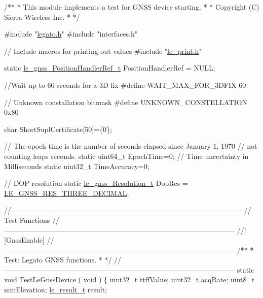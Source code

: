 
\begin{DoxyCodeInclude}
\textcolor{comment}{ /**}
\textcolor{comment}{  * This module implements a test for GNSS device starting.}
\textcolor{comment}{  *}
\textcolor{comment}{  * Copyright (C) Sierra Wireless Inc.}
\textcolor{comment}{  *}
\textcolor{comment}{  */}

\textcolor{preprocessor}{#include "\hyperlink{legato_8h}{legato.h}"}
\textcolor{preprocessor}{#include "interfaces.h"}

\textcolor{comment}{// Include macros for printing out values}
\textcolor{preprocessor}{#include "\hyperlink{le__print_8h}{le\_print.h}"}

\textcolor{keyword}{static} \hyperlink{le__gnss__interface_8h_a55a27b330b348c8d78073fe0e3e784eb}{le\_gnss\_PositionHandlerRef\_t} PositionHandlerRef = NULL;

\textcolor{comment}{//Wait up to 60 seconds for a 3D fix}
\textcolor{preprocessor}{#define WAIT\_MAX\_FOR\_3DFIX  60}

\textcolor{comment}{// Unknown constallation bitmask}
\textcolor{preprocessor}{#define UNKNOWN\_CONSTELLATION  0x80}

\textcolor{keywordtype}{char} ShortSuplCertificate[50]=\{0\};

\textcolor{comment}{// The epoch time is the number of seconds elapsed since January 1, 1970}
\textcolor{comment}{// not counting leaps seconds.}
\textcolor{keyword}{static} uint64\_t EpochTime=0;
\textcolor{comment}{// Time uncertainty in Milliseconds}
\textcolor{keyword}{static} uint32\_t TimeAccuracy=0;

\textcolor{comment}{// DOP resolution}
\textcolor{keyword}{static} \hyperlink{le__gnss__interface_8h_aaf5d256c75737a2189c8da7bfed5da0d}{le\_gnss\_Resolution\_t} DopRes = 
      \hyperlink{le__gnss__interface_8h_aaf5d256c75737a2189c8da7bfed5da0da4c6bce2bb0595f9683e7333ce637cb5c}{LE\_GNSS\_RES\_THREE\_DECIMAL};

\textcolor{comment}{//--------------------------------------------------------------------------------------------------}
\textcolor{comment}{//                                       Test Functions}
\textcolor{comment}{//--------------------------------------------------------------------------------------------------}
\textcolor{comment}{}
\textcolor{comment}{//! [GnssEnable]}
\textcolor{comment}{}\textcolor{comment}{//--------------------------------------------------------------------------------------------------}\textcolor{comment}{}
\textcolor{comment}{/**}
\textcolor{comment}{ * Test: Legato GNSS functions.}
\textcolor{comment}{ *}
\textcolor{comment}{ */}
\textcolor{comment}{//--------------------------------------------------------------------------------------------------}
\textcolor{keyword}{static} \textcolor{keywordtype}{void} TestLeGnssDevice
(
    \textcolor{keywordtype}{void}
)
\{
    uint32\_t ttffValue;
    uint32\_t acqRate;
    uint8\_t  minElevation;
    \hyperlink{le__basics_8h_a1cca095ed6ebab24b57a636382a6c86c}{le\_result\_t} result;


\end{DoxyCodeInclude}

